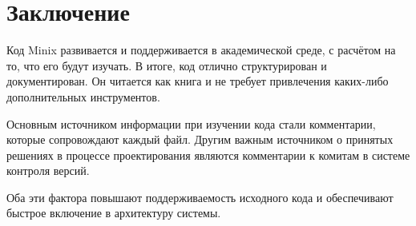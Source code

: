 \newpage
\section*{Заключение}

Код Minix развивается и поддерживается в академической среде, с расчётом на то, что его будут изучать. В итоге, код отлично структурирован и документирован. Он читается как книга и не требует привлечения каких-либо дополнительных инструментов.

Основным источником информации при изучении кода стали комментарии, которые сопровождают каждый файл. Другим важным источником о принятых решениях в процессе проектирования являются комментарии к комитам в системе контроля версий.

Оба эти фактора повышают поддерживаемость исходного кода и обеспечивают быстрое включение в архитектуру системы.
